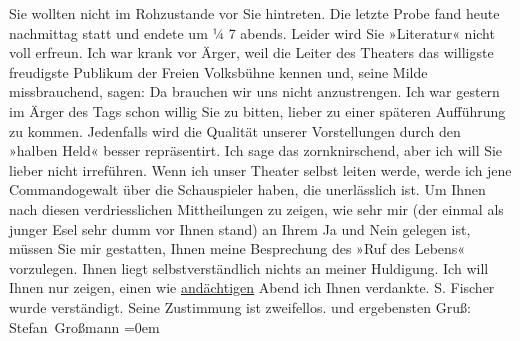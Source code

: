 \begin{ledgroupsized}[t]{13cm}
               Sie wollten nicht im Rohzustande vor Sie hintreten.\pend
           \pstart
           Die letzte Probe fand heute nachmittag statt und endete um ¼ 7
               abends.\pend
           \pstart
           Leider wird Sie »Literatur« nicht voll erfreun. Ich
               war krank vor Ärger, weil die Leiter des Theaters das willigste  freudigste Publikum der Freien Volksbühne kennen und, seine Milde missbrauchend, sagen: Da brauchen
               wir uns nicht anzustrengen.\pend
           \pstart
           {\pb}Ich war gestern im Ärger des Tags schon
               willig Sie zu bitten, lieber zu einer späteren Aufführung zu kommen. Jedenfalls wird
               die Qualität unserer Vorstellungen durch den »halben
                  Held« besser repräsentirt.\pend
           \pstart
           Ich sage das zornknirschend, aber ich will Sie lieber nicht irreführen. Wenn ich
               unser Theater selbst leiten werde, werde ich jene {\pb}Commandogewalt über die Schauspieler haben,
               die unerlässlich ist.\pend
           \pstart
           Um Ihnen nach diesen verdriesslichen Mittheilungen zu zeigen, wie sehr mir (der
               einmal als junger Esel sehr dumm vor Ihnen stand) an Ihrem Ja und Nein gelegen ist,
               müssen Sie mir gestatten, Ihnen meine Besprechung des »Ruf des Lebens«
               vorzulegen. Ihnen liegt selbstverständlich nichts an {\pb}meiner Huldigung. Ich will Ihnen nur zeigen,
               einen wie \uline{andächtigen} Abend ich Ihnen verdankte.\pend
           \pstart
           S. Fischer wurde verständigt. Seine Zustimmung
               ist zweifellos.\pend
           \pstart
            und ergebensten Gruß:{\\[\baselineskip]}\spacefill\mbox{Stefan
                  Großmann}\pend
           \leftskip=0em{}
         
         \endnumbering{}\end{ledgroupsized}  \newcommand{\dateiname}{L01921}\newcommand{\titel}{Stefan Großmann an Arthur Schnitzler, 2. 4. 1910}\newcommand{\editorInnen}{ Martin Anton Müller und Gerd-Hermann Susen}
      